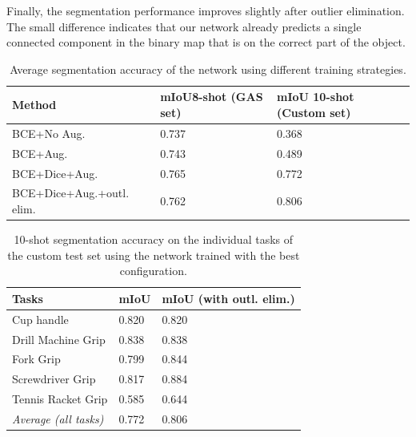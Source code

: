 \documentclass[letterpaper]{article} %
\begin{document}
Finally, the segmentation performance improves slightly after outlier elimination. The small difference indicates that our network already predicts a single connected component in the binary map that is on the correct part of the object.


\begin{table}[h!]
\centering
\caption{Average segmentation accuracy of the network using different training strategies.}
\begin{tabular}{|p{3.5cm}|p{1.6cm}|p{2.0cm}|}
 \hline
 \textbf{Method}& \textbf{mIoU}\newline \textbf{8-shot} \newline \textbf{(GAS set)} & \textbf{mIoU} \newline \textbf{10-shot} \newline \textbf{(Custom set)}  \\
 \hline
 BCE+No Aug.& 0.737 & 0.368  \\ 
 \hline
 BCE+Aug.& 0.743 & 0.489  \\ 
 \hline
 BCE+Dice+Aug. & 0.765 & 0.772  \\ 
 \hline
 BCE+Dice+Aug.+outl. elim. & 0.762& 0.806 \\
 \hline
\end{tabular}
\label{table:networks}
\end{table}

\begin{table}[h!]
\centering
\caption{10-shot segmentation accuracy on the individual tasks of the custom test set using the network trained with the best configuration.}
\begin{tabular}{|p{3.2cm}|p{1.2cm}|p{2.6cm}|}
 \hline
 \textbf{Tasks} & \textbf{mIoU}  & \textbf{mIoU} \newline \textbf{(with outl. elim.)} \\
 \hline
 Cup handle & 0.820 & 0.820 \\ 
 \hline
 Drill Machine Grip & 0.838 & 0.838 \\ 
 \hline
 Fork Grip & 0.799 & 0.844 \\ 
 \hline
 Screwdriver Grip  & 0.817 & 0.884\\
 \hline
 Tennis Racket Grip & 0.585 & 0.644 \\
 \hline
 \textit{Average (all tasks)} & 0.772 & 0.806\\
 \hline
\end{tabular}
\label{table:tasks}
\end{table}
\end{document}

